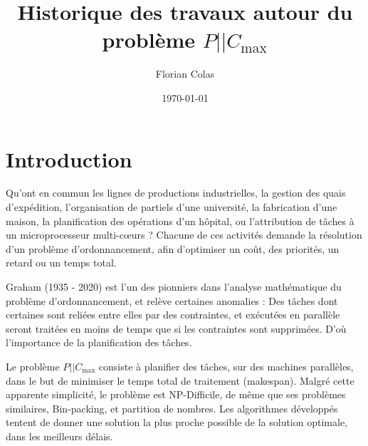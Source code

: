 \documentclass[a4paper,12pt]{report}
\title{Historique des travaux autour du problème $P||C_{\max}$}
\author{Florian Colas}
\date{\today}
\theoremstyle{plain}				%
\theoremstyle{definition}				%
\newcommand\problemGrahamP{$P||C_{\max}$\xspace}
\begin{document}
\maketitle

%
%
%
\renewcommand{\thesection}{\arabic{section}}
\renewcommand{\contentsname}{Sommaire}
\setcounter{tocdepth}{4}	%
\setcounter{secnumdepth}{3}	%
\tableofcontents

\section{Introduction}

Qu'ont en commun les lignes de productions industrielles, la gestion des quais d'expédition, l'organisation de partiels d'une université, la fabrication d'une maison, la planification des opérations d'un hôpital, ou l'attribution de tâches à un microprocesseur multi-cœurs ? Chacune de ces activités demande la résolution d'un problème d'ordonnancement, afin d'optimiser un coût, des priorités, un retard ou un temps total.
 
Graham (1935 - 2020) est l'un des pionniers dans l'analyse mathématique du problème d'ordonnancement, et relève certaines anomalies \cite{graham1966bounds} : Des tâches dont certaines sont reliées entre elles par des contraintes, et exécutées en parallèle seront traitées en moins de temps que si les contraintes sont supprimées. D'où l'importance de la planification des tâches.
 
Le problème \problemGrahamP consiste à planifier des tâches, sur des machines parallèles, dans le but de minimiser le temps total de traitement (makespan). Malgré cette apparente simplicité, le problème est NP-Difficile, de même que ses problèmes similaires, Bin-packing, et partition de nombres. Les algorithmes développés tentent de donner une solution la plus proche possible de la solution optimale, dans les meilleurs délais. 
\end{document}
